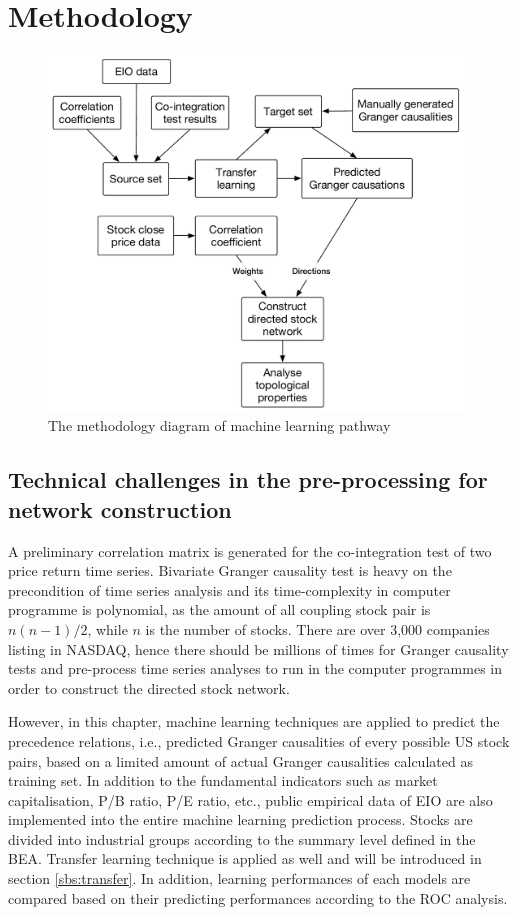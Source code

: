 \section{Methodology}

\begin{figure}
	\begin{center}
		\includegraphics[width=11cm]{methodology_diagram_dnn}
	\end{center}
	\caption{The methodology diagram of machine learning pathway}
	\label{fig:methodology_diagram_dnn}
\end{figure}

\subsection{Technical challenges in the pre-processing for network construction}
A preliminary correlation matrix is generated for the co-integration test of two price return time series. Bivariate Granger causality test is heavy on the precondition of time series analysis and its time-complexity in computer programme is polynomial, as the amount of all coupling stock pair is $n(n-1)/2$, while $n$ is the number of stocks. There are over 3,000 companies listing in NASDAQ, hence there should be millions of times for Granger causality tests and pre-process time series analyses to run in the computer programmes in order to construct the directed stock network.

However, in this chapter, machine learning techniques are applied to predict the precedence relations, i.e., predicted Granger causalities of every possible US stock pairs, based on a limited amount of actual Granger causalities calculated as training set. In addition to the fundamental indicators such as market capitalisation, P/B ratio, P/E ratio, etc., public empirical data of EIO are also implemented into the entire machine learning prediction process. Stocks are divided into industrial groups according to the summary level defined in the BEA. Transfer learning technique is applied as well and will be introduced in section \ref{sbs:transfer}. In addition, learning performances of each models are compared based on their predicting performances according to the ROC analysis.

